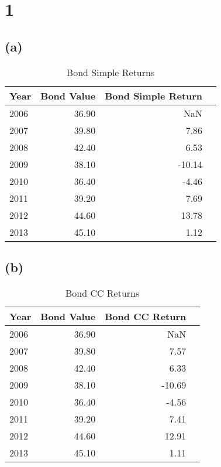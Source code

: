    \section{1}\label{section}

    \subsection{(a)}\label{a}

\begin{table}[H]
\centering
\caption{Bond Simple Returns}
\label{tab:bond_simple_returns}
\begin{tabular}{lrrr}
\toprule
Year & Bond Value & Bond Simple Return \\
\midrule
2006 & 36.90 & NaN \\
2007 & 39.80 & 7.86 \\
2008 & 42.40 & 6.53 \\
2009 & 38.10 & -10.14 \\
2010 & 36.40 & -4.46 \\
2011 & 39.20 & 7.69 \\
2012 & 44.60 & 13.78 \\
2013 & 45.10 & 1.12 \\
\bottomrule
\end{tabular}
\end{table}



    \subsection{(b)}\label{b}

\begin{table}[H]
\centering
\caption{Bond CC Returns}
\label{tab:bond_cc_returns}
\begin{tabular}{lrrr}
\toprule
Year & Bond Value & Bond CC Return \\
\midrule
2006 & 36.90 & NaN \\
2007 & 39.80 & 7.57 \\
2008 & 42.40 & 6.33 \\
2009 & 38.10 & -10.69 \\
2010 & 36.40 & -4.56 \\
2011 & 39.20 & 7.41 \\
2012 & 44.60 & 12.91 \\
2013 & 45.10 & 1.11 \\
\bottomrule
\end{tabular}
\end{table}




